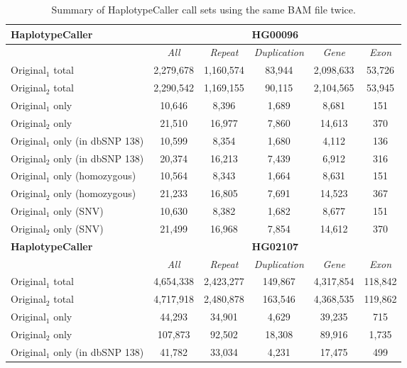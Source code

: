 \begin{table}[htb]
\caption{ Summary of HaplotypeCaller call sets using the same BAM file twice. }
\begin{center}
\begin{tabular}{|l|c||c|c|c|c|}
\hline
{\bf HaplotypeCaller} & \multicolumn{5}{|c|}{\bf HG00096} \\
\hline
\cline{2-6}
{\bf} & {\it All} & {\it Repeat} & {\it Duplication} & {\it Gene} & {\it Exon} \\
\hline
Original$_1$ total & 2,279,678 & 1,160,574 & 83,944 & 2,098,633 & 53,726 \\
\hline
Original$_2$ total & 2,290,542 & 1,169,155 & 90,115 & 2,104,565 & 53,945 \\
\hline
Original$_1$ only & 10,646    & 8,396     & 1,689  & 8,681     & 151    \\
\hline
Original$_2$ only & 21,510    & 16,977    & 7,860  & 14,613    & 370    \\
\hline
Original$_1$ only (in dbSNP 138) & 10,599    & 8,354     & 1,680  & 4,112     & 136    \\
\hline
Original$_2$ only (in dbSNP 138) & 20,374    & 16,213    & 7,439  & 6,912     & 316    \\
\hline
Original$_1$ only (homozygous) & 10,564    & 8,343     & 1,664  & 8,631     & 151    \\
\hline
Original$_2$ only (homozygous) & 21,233    & 16,805    & 7,691  & 14,523    & 367    \\
\hline
Original$_1$ only (SNV) & 10,630    & 8,382     & 1,682  & 8,677     & 151    \\
\hline
Original$_2$ only (SNV) & 21,499    & 16,968    & 7,854  & 14,612    & 370    \\
\hline
\hline
{\bf HaplotypeCaller} & \multicolumn{5}{|c|}{\bf HG02107} \\
\hline
\cline{2-6}
{\bf} & {\it All} & {\it Repeat} & {\it Duplication} & {\it Gene} & {\it Exon} \\
\hline
Original$_1$ total & 4,654,338 & 2,423,277 & 149,867 & 4,317,854 & 118,842 \\
\hline
Original$_2$ total & 4,717,918 & 2,480,878 & 163,546 & 4,368,535 & 119,862 \\
\hline
Original$_1$ only & 44,293    & 34,901    & 4,629   & 39,235    & 715     \\
\hline
Original$_2$ only & 107,873   & 92,502    & 18,308  & 89,916    & 1,735   \\
\hline
Original$_1$ only (in dbSNP 138) & 41,782    & 33,034    & 4,231   & 17,475    & 499     \\

\end{tabular}
\end{center}
\end{table}
